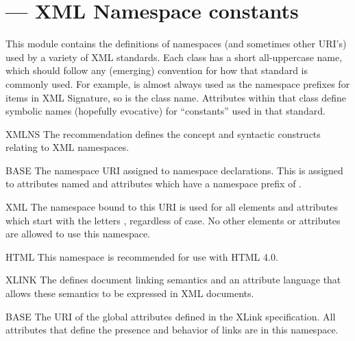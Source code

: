 \documentclass{howto}
\begin{document}


\section{ ---
         XML Namespace constants}


This module contains the definitions of namespaces (and sometimes
other URI's) used by a variety of XML standards.  Each class has a
short all-uppercase name, which should follow any (emerging)
convention for how that standard is commonly used.  For example,
 is almost always used as the namespace prefixes for items in
XML Signature, so  is the class name.  Attributes within that
class define symbolic names (hopefully evocative) for ``constants''
used in that standard.

\begin{classdesc*}{XMLNS}
  The  recommendation defines the concept and syntactic constructs
  relating to XML namespaces.

  \begin{memberdesc}{BASE}
    The namespace URI assigned to namespace declarations.  This is
    assigned to attributes named  and attributes which
    have a namespace prefix of .
  \end{memberdesc}

  \begin{memberdesc}{XML}
    The namespace bound to this URI is used for all elements and
    attributes which start with the letters , regardless of
    case.  No other elements or attributes are allowed to use this
    namespace.
  \end{memberdesc}

  \begin{memberdesc}{HTML}
    This namespace is recommended for use with HTML 4.0.
  \end{memberdesc}
\end{classdesc*}


\begin{classdesc*}{XLINK}
  The 
  defines document linking semantics and an attribute language that
  allows these semantics to be expressed in XML documents.

  \begin{memberdesc}{BASE}
    The URI of the global attributes defined in the XLink
    specification.  All attributes that define the presence and
    behavior of links are in this namespace.
  \end{memberdesc}
\end{classdesc*}
\end{document}

